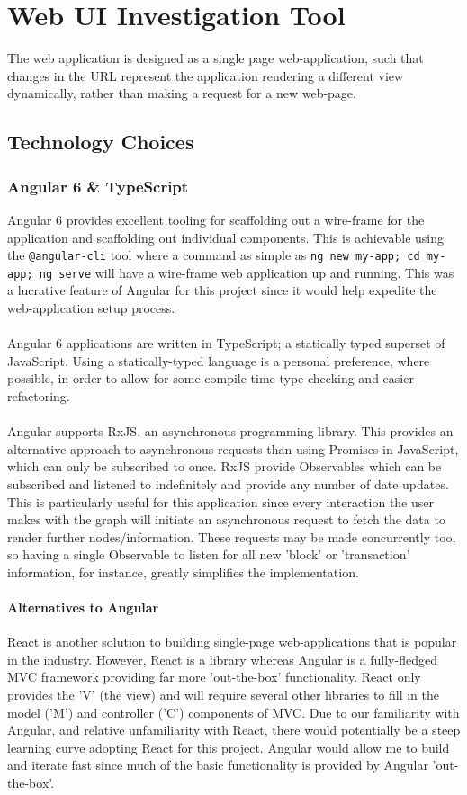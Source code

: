 \chapter{Web UI Investigation Tool}\label{section-investigation-tool}
The web application is designed as a single page web-application, such that changes in the URL represent the application rendering a different view dynamically, rather than making a request for a new web-page. 

\section{Technology Choices}
\subsection{Angular 6 \& TypeScript}
Angular 6 provides excellent tooling for scaffolding out a wire-frame for the application and scaffolding out individual components. This is achievable using the \texttt{@angular-cli} tool where a command as simple as \texttt{ng new my-app; cd my-app; ng serve} will have a wire-frame web application up and running. This was a lucrative feature of Angular for this project since it would help expedite the web-application setup process.
\\\\
Angular 6 applications are written in TypeScript; a statically typed superset of JavaScript. Using a statically-typed language is a personal preference, where possible, in order to allow for some compile time type-checking and easier refactoring. 
\\\\
Angular supports RxJS, an asynchronous programming library. This provides an alternative approach to asynchronous requests than using Promises in JavaScript, which can only be subscribed to once. RxJS provide Observables which can be subscribed and listened to indefinitely and provide any number of date updates. This is particularly useful for this application since every interaction the user makes with the graph will initiate an asynchronous request to fetch the data to render further nodes/information. These requests may be made concurrently too, so having a single Observable to listen for all new 'block' or 'transaction' information, for instance, greatly simplifies the implementation.

\subsubsection{Alternatives to Angular}
React is another solution to building single-page web-applications that is popular in the industry. However, React is a library whereas Angular is a fully-fledged MVC framework providing far more 'out-the-box' functionality. React only provides the 'V' (the view) and will require several other libraries to fill in the model ('M') and controller ('C') components of MVC. Due to our familiarity with Angular, and relative unfamiliarity with React, there would potentially be a steep learning curve adopting React for this project. Angular would allow me to build and iterate fast since much of the basic functionality is provided by Angular 'out-the-box'.

